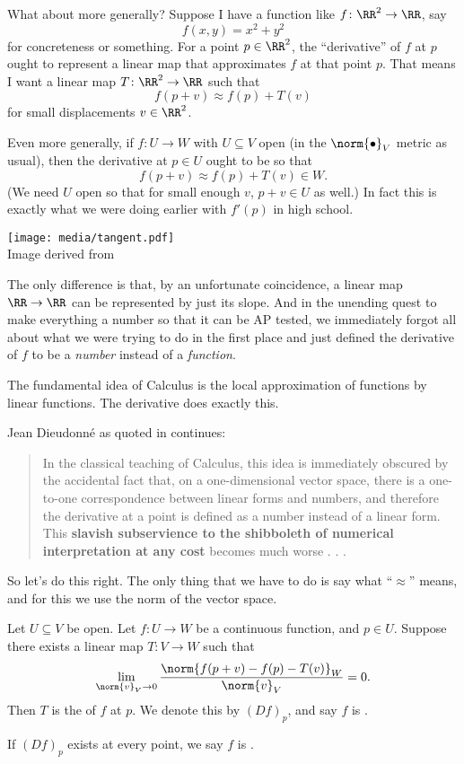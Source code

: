 What about more generally?
Suppose I have a function like $f \colon \RR^2 \to \RR$, say
\[ f(x,y) = x^2+y^2 \]
for concreteness or something.
For a point $p \in \RR^2$, the ``derivative'' of $f$ at $p$ ought to represent a linear map
that approximates $f$ at that point $p$.
That means I want a linear map $T \colon \RR^2 \to \RR$ such that
\[ f(p + v) \approx f(p) + T(v) \]
for small displacements $v \in \RR^2$.

Even more generally, if $f \colon U \to W$ with $U \subseteq V$ open
(in the $\norm{\bullet}_V$ metric as usual),
then the derivative at $p \in U$ ought to be so that
\[ f(p + v) \approx f(p) + T(v) \in W. \]
(We need $U$ open so that for small enough $v$, $p+v \in U$ as well.)
In fact this is exactly what we were doing earlier with $f'(p)$ in high school.

\begin{center}
	\texttt{[image: media/tangent.pdf]}
	\\ \scriptsize Image derived from \cite{img:tangentplane}
\end{center}

The only difference is that, by an unfortunate coincidence,
a linear map $\RR \to \RR$ can be represented by just its slope.
And in the unending quest to make everything a number so that it can be AP tested,
we immediately forgot all about what we were trying to do in the first place
and just defined the derivative of $f$ to be a \emph{number} instead of a \emph{function}.

\begin{moral}
	The fundamental idea of Calculus is the local approximation of functions by linear functions.
	The derivative does exactly this.
\end{moral}
Jean Dieudonn\'e as quoted in \cite{ref:pugh} continues:
\begin{quote}
	In the classical teaching of Calculus, this idea is immediately obscured
	by the accidental fact that, on a one-dimensional vector space,
	there is a one-to-one correspondence between linear forms and numbers,
	and therefore the derivative at a point is defined as a number instead of a linear form.
	This \textbf{slavish subservience to the shibboleth of numerical interpretation at any cost}
	becomes much worse . . .
\end{quote}

So let's do this right.
The only thing that we have to do is say what ``$\approx$'' means, and for
this we use the norm of the vector space.
\begin{definition}
	Let $U \subseteq V$ be open.
	Let $f \colon U \to W$ be a continuous function, and $p \in U$.
	Suppose there exists a linear map $T \colon V \to W$ such that
	\[
		\lim_{\norm{v}_V \to 0}
		\frac{\norm{f(p + v) - f(p) - T(v)}_W}{\norm{v}_V} = 0.
	\]
	Then $T$ is the  of $f$ at $p$.
	We denote this by $(Df)_p$, and say $f$ is .

	If $(Df)_p$ exists at every point, we say $f$ is .
\end{definition}

